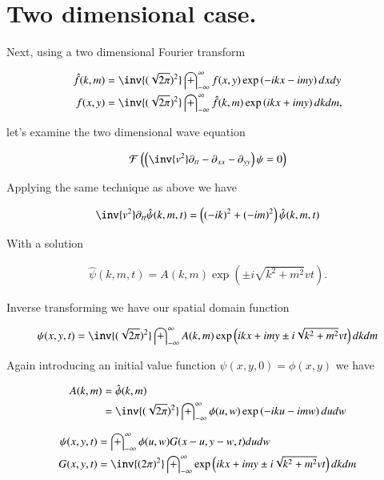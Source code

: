 \documentclass{article}
\newcommand{\FF}[0]{\mathcal{F}}
\newcommand{\IIinf}[0]{ \int_{-\infty}^\infty }
\begin{document}
\section{ Two dimensional case. }

Next, using a two dimensional Fourier transform

\begin{align*}
\hat{f}(k,m) &= \inv{(\sqrt{2\pi})^2} \IIinf f(x,y) \exp\left( -i k x - i m y \right) dx dy \\
{f}(x,y) &= \inv{(\sqrt{2\pi})^2} \IIinf \hat{f}(k,m) \exp\left( i k x + i m y \right) dk dm,
\end{align*}

let's examine the two dimensional wave equation

\begin{align*}
\FF\left( \left(\inv{v^2} \partial_{tt} -\partial_{xx} -\partial_{yy} \right)\psi = 0 \right)
\end{align*}

Applying the same technique as above we have

\begin{align*}
\inv{v^2}\partial_{tt}\hat{\psi}(k,m,t) = \left((-i k)^2 + (-i m)^2\right) \hat{\psi}(k,m,t)
\end{align*}

With a solution 

\begin{align*}
\hat{\psi}(k,m,t) = A(k,m) \exp\left( \pm i \sqrt{k^2 + m^2} v t \right).
\end{align*}

Inverse transforming we have our spatial domain function

\begin{align*}
{\psi}(x,y,t) = \inv{(\sqrt{2\pi})^2} \IIinf A(k,m) \exp\left( i k x + i m y \pm i \sqrt{k^2 + m^2} v t \right) dk dm
\end{align*}

Again introducing an initial value function $\psi(x,y,0) = \phi(x,y)$ we have

\begin{align*}
A(k,m) 
&= \hat{\phi}(k,m) \\
&= \inv{(\sqrt{2\pi})^2} \IIinf \phi(u,w) \exp\left( -i k u - i m w \right) du dw
\end{align*}

\begin{align}\label{eqn:greensSolution}
{\psi}(x,y,t) &= \IIinf \phi(u,w) G( x-u, y-w, t) du dw \\
G(x,y,t) &= \inv{({2\pi})^2} \IIinf \exp\left( i k x + i m y \pm i \sqrt{k^2 + m^2} v t \right) dk dm \\
\end{align}
\end{document}
